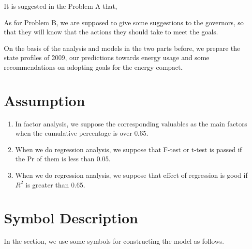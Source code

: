 \documentclass[a4paper,11pt]{article}
\begin{document}
\par It is suggested in the Problem A that,

\par As for Problem B, we are supposed to give some suggestions to the governors, so that they will know that the actions they should take to meet the goals.

\par On the basis of the analysis and models in the two parts before, we prepare the state profiles of 2009, our predictions towards energy usage and some recommendations on adopting goals for the energy compact.


\section{Assumption}
\begin{enumerate}%
\renewcommand{\labelenumi}{(\theenumi)}
    \item In factor analysis, we suppose the corresponding valuables as the main factors when the cumulative percentage is over 0.65.
    \item When we do regression analysis, we suppose that F-test or t-test is passed if the Pr of them is less than 0.05.
    \item When we do regression analysis, we suppose that effect of regression is good if $R^{2}$ is greater than 0.65.
\end{enumerate}



\section{Symbol Description}
In the section, we use some symbols for constructing the model as follows.
\end{document}
